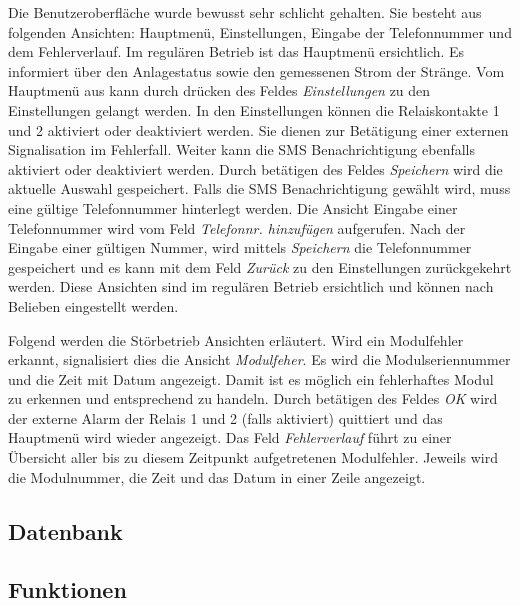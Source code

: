 Die Benutzeroberfl\"ache wurde bewusst sehr schlicht gehalten. Sie besteht aus
folgenden  Ansichten: Hauptmen\"u,  Einstellungen, Eingabe  der  Telefonnummer
und   dem   Fehlerverlauf. Im   regul\"aren  Betrieb   ist   das   Hauptmen\"u
ersichtlich. Es  informiert  \"uber  den  Anlagestatus  sowie  den  gemessenen
Strom  der Str\"ange. Vom  Hauptmen\"u  aus kann  durch  dr\"ucken des  Feldes
\emph{Einstellungen} zu den Einstellungen gelangt werden. In den Einstellungen
k\"onnen die  Relaiskontakte 1  und 2  aktiviert oder  deaktiviert werden. Sie
dienen  zur Bet\"atigung  einer externen  Signalisation im  Fehlerfall. Weiter
kann   die  SMS   Benachrichtigung   ebenfalls   aktiviert  oder   deaktiviert
werden. Durch  bet\"atigen  des  Feldes  \emph{Speichern}  wird  die  aktuelle
Auswahl  gespeichert. Falls  die  SMS Benachrichtigung  gew\"ahlt  wird,  muss
eine  g\"ultige Telefonnummer  hinterlegt werden.   Die Ansicht  Eingabe einer
Telefonnummer  wird vom  Feld \emph{Telefonnr.  hinzuf\"ugen} aufgerufen. Nach
der  Eingabe  einer  g\"ultigen  Nummer,  wird  mittels  \emph{Speichern}  die
Telefonnummer  gespeichert und  es kann  mit dem  Feld \emph{Zur\"uck}  zu den
Einstellungen  zur\"uckgekehrt  werden. Diese  Ansichten sind  im  regul\"aren
Betrieb ersichtlich und k\"onnen nach Belieben eingestellt werden.

Folgend werden  die St\"orbetrieb Ansichten erl\"autert. Wird  ein Modulfehler
erkannt,  signalisiert   dies  die  Ansicht  \emph{Modulfeher}. Es   wird  die
Modulseriennummer und die Zeit mit Datum angezeigt. Damit ist es m\"oglich ein
fehlerhaftes Modul zu erkennen  und entsprechend zu handeln. Durch bet\"atigen
des  Feldes  \emph{OK} wird  der  externe  Alarm der  Relais  1  und 2  (falls
aktiviert)  quittiert  und das  Hauptmen\"u  wird  wieder angezeigt. Das  Feld
\emph{Fehlerverlauf}  f\"uhrt  zu  einer   \"Ubersicht  aller  bis  zu  diesem
Zeitpunkt aufgetretenen  Modulfehler. Jeweils wird  die Modulnummer,  die Zeit
und das Datum in einer Zeile angezeigt.


\subsection{Datenbank}
\label{subsec:software:master:database}

\subsection{Funktionen}
\label{subsec:software:master:functions}
